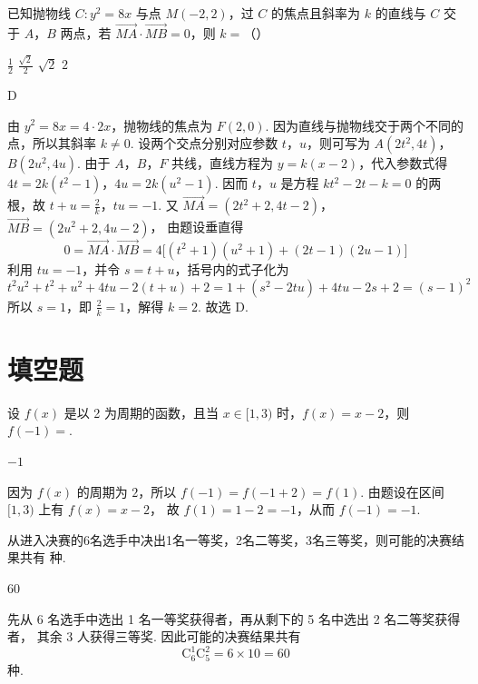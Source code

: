 \begin{problem}
已知抛物线 \(C: y^{2} = 8x\) 与点 \(M(-2, 2)\)，过 \(C\) 的焦点且斜率为 \(k\) 的直线与 \(C\) 交于 \(A\)，\(B\) 两点，若 \(\overrightarrow{MA} \cdot \overrightarrow{MB} = 0\)，则 \(k =\)（\quad）

\choices
    {\(\frac{1}{2}\)}
    {\( \frac{\sqrt{2}}{2} \)}
    {\(\sqrt{2}\)}
    {\(2\)}

\begin{answer}
D
\end{answer}

\begin{solution}
由 \(y^2=8x=4\cdot2x\)，抛物线的焦点为 \(F(2,0)\). 因为直线与抛物线交于两个不同的点，所以其斜率 \(k\ne0\). 设两个交点分别对应参数
\(t\)，\(u\)，则可写为
\(A(2t^2,4t)\)，\(B(2u^2,4u)\).
由于 \(A\)，\(B\)，\(F\) 共线，直线方程为 \(y=k(x-2)\)，代入参数式得
\(4t=2k(t^2-1)\)，\(4u=2k(u^2-1)\). 因而 \(t\)，\(u\) 是方程
\(kt^2-2t-k=0\) 的两根，故
\(t+u=\frac{2}{k}\)，\(tu=-1\).
又 \(\overrightarrow{MA}=(2t^2+2,4t-2)\)，\(\overrightarrow{MB}=(2u^2+2,4u-2)\)，
由题设垂直得
\[
0=\overrightarrow{MA}\cdot\overrightarrow{MB}
=4\bigl[(t^2+1)(u^2+1)+(2t-1)(2u-1)\bigr]
\]
利用 \(tu=-1\)，并令 \(s=t+u\)，括号内的式子化为
\[
t^2u^2+t^2+u^2+4tu-2(t+u)+2
=1+(s^2-2tu)+4tu-2s+2=(s-1)^2
\]
所以 \(s=1\)，即 \(\frac{2}{k}=1\)，解得 \(k=2\). 故选 D.
\end{solution}
\end{problem}

\section{填空题}

\begin{problem}
设 \( f(x) \) 是以 2 为周期的函数，且当 \( x \in [1,3) \) 时，\( f(x) = x - 2 \)，则 \( f(-1) = \)\fillinblank{}.

\begin{answer}
\(-1\)
\end{answer}

\begin{solution}
因为 \(f(x)\) 的周期为 \(2\)，所以
\(f(-1)=f(-1+2)=f(1)\). 由题设在区间 \([1,3)\) 上有 \(f(x)=x-2\)，
故 \(f(1)=1-2=-1\)，从而 \(f(-1)=-1\).
\end{solution}
\end{problem}

\begin{problem}
从进入决赛的6名选手中决出1名一等奖，2名二等奖，3名三等奖，则可能的决赛结果共有\fillinblank{} 种.

\begin{answer}
60
\end{answer}

\begin{solution}
先从 6 名选手中选出 1 名一等奖获得者，再从剩下的 5 名中选出 2 名二等奖获得者，
其余 3 人获得三等奖. 因此可能的决赛结果共有
\[
\mathrm C_6^1\mathrm C_5^2=6\times10=60
\]
种.
\end{solution}
\end{problem}

